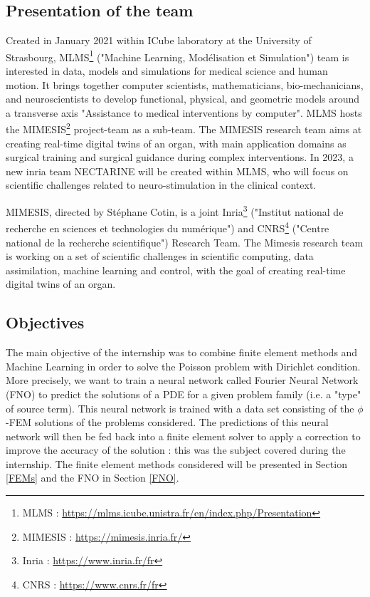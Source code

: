 \subsection{Presentation of the team}

Created in January 2021 within ICube laboratory at the University of Strasbourg, MLMS\footnote{MLMS : \url{https://mlms.icube.unistra.fr/en/index.php/Presentation}} ("Machine Learning, Modélisation et Simulation") team is interested in data, models and simulations for medical science and human motion. It brings together computer scientists, mathematicians, bio-mechanicians, and neuroscientists to develop functional, physical, and geometric models around a transverse axis "Assistance to medical interventions by computer". MLMS hosts the MIMESIS\footnote{MIMESIS : \url{https://mimesis.inria.fr/}} project-team as a sub-team. The MIMESIS research team aims at creating real-time digital twins of an organ, with main application domains as surgical training and surgical guidance during complex interventions. In 2023, a new inria team NECTARINE will be created within MLMS, who will focus on scientific challenges related to neuro-stimulation in the clinical context. 

MIMESIS, directed by Stéphane Cotin, is a joint Inria\footnote{Inria : \url{https://www.inria.fr/fr}} ("Institut national de recherche en sciences et technologies du numérique") and CNRS\footnote{CNRS : \url{https://www.cnrs.fr/fr}} ("Centre national de la recherche scientifique") Research Team. The Mimesis research team is working on a set of scientific challenges in scientific computing, data assimilation, machine learning and control, with the goal of creating real-time digital twins of an organ.

\subsection{Objectives}

The main objective of the internship was to combine finite element methods and Machine Learning in order to solve the Poisson problem with Dirichlet condition. More precisely, we want to train a neural network called Fourier Neural Network (FNO) \cite{li_fourier_2021} to predict the solutions of a PDE for a given problem family (i.e. a "type" of source term). This neural network is trained with a data set consisting of the $\phi$-FEM solutions of the problems considered. The predictions of this neural network will then be fed back into a finite element solver to apply a correction to improve the accuracy of the solution : this was the subject covered during the internship. The finite element methods considered will be presented in Section \ref{FEMs} and the FNO in Section \ref{FNO}.

